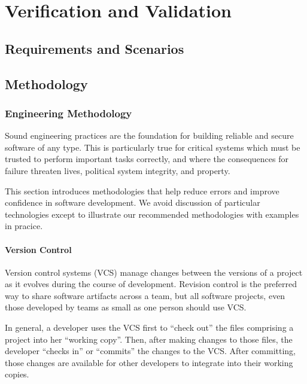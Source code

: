 \chapter{Verification and Validation}
\label{chapter:v_and_v}

\section{Requirements and Scenarios}
\section{Methodology}

\subsection{Engineering Methodology}



Sound engineering practices are the foundation for building reliable
and secure software of any type. This is particularly true for
critical systems which must be trusted to perform important tasks
correctly, and where the consequences for failure threaten lives,
political system integrity, and property.

This section introduces methodologies that help reduce errors and
improve confidence in software development. We avoid discussion of
particular technologies except to illustrate our recommended
methodologies with examples in pracice.

\subsubsection{Version Control}

Version control systems (VCS) manage changes between the versions of a
project as it evolves during the course of development. Revision
control is the preferred way to share software artifacts across a
team, but all software projects, even those developed by teams as
small as one person should use VCS.

In general, a developer uses the VCS first to ``check out'' the files
comprising a project into her ``working copy''. Then, after making
changes to those files, the developer ``checks in'' or ``commits'' the
changes to the VCS. After committing, those changes are available for
other developers to integrate into their working copies.

